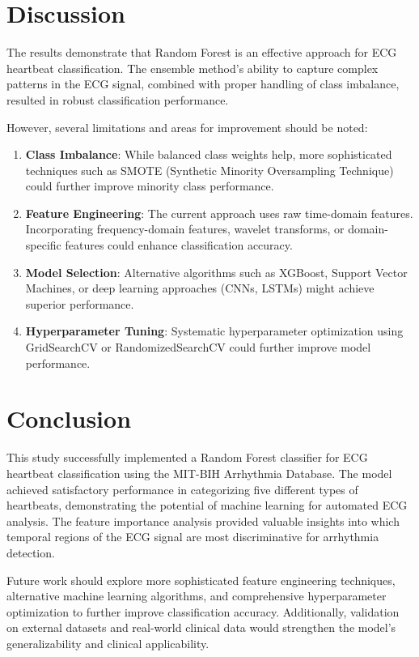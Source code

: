 \documentclass[conference]{IEEEtran}
\begin{document}
\section{Discussion}

The results demonstrate that Random Forest is an effective approach for ECG heartbeat classification. The ensemble method's ability to capture complex patterns in the ECG signal, combined with proper handling of class imbalance, resulted in robust classification performance.

However, several limitations and areas for improvement should be noted:
\begin{enumerate}
    \item \textbf{Class Imbalance}: While balanced class weights help, more sophisticated techniques such as SMOTE (Synthetic Minority Oversampling Technique) could further improve minority class performance.
    \item \textbf{Feature Engineering}: The current approach uses raw time-domain features. Incorporating frequency-domain features, wavelet transforms, or domain-specific features could enhance classification accuracy.
    \item \textbf{Model Selection}: Alternative algorithms such as XGBoost, Support Vector Machines, or deep learning approaches (CNNs, LSTMs) might achieve superior performance.
    \item \textbf{Hyperparameter Tuning}: Systematic hyperparameter optimization using GridSearchCV or RandomizedSearchCV could further improve model performance.
\end{enumerate}

\section{Conclusion}

This study successfully implemented a Random Forest classifier for ECG heartbeat classification using the MIT-BIH Arrhythmia Database. The model achieved satisfactory performance in categorizing five different types of heartbeats, demonstrating the potential of machine learning for automated ECG analysis. The feature importance analysis provided valuable insights into which temporal regions of the ECG signal are most discriminative for arrhythmia detection.

Future work should explore more sophisticated feature engineering techniques, alternative machine learning algorithms, and comprehensive hyperparameter optimization to further improve classification accuracy. Additionally, validation on external datasets and real-world clinical data would strengthen the model's generalizability and clinical applicability.
\end{document}
